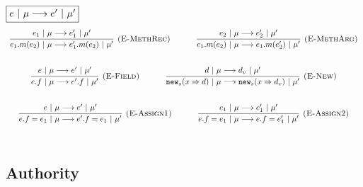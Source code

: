 \documentclass{llncs}
\newcommand{\keywadj}[1]{\mathtt{#1}}
\begin{document}
$\fbox{$e~|~\mu \longrightarrow e'~|~\mu'$}$
\[
\begin{array}{c}
\infer[\textsc{(E-MethRec)}]
  {e_1.m(e_2)~|~\mu \longrightarrow e_1'.m(e_2)~|~\mu'}
  {e_1~|~\mu \longrightarrow e_1'~|~\mu'}%
~~~~~~~~~~
\infer[\textsc{(E-MethArg)}]
  {e_1.m(e_2)~|~\mu \longrightarrow e_1.m(e_2')~|~\mu'}
  {e_2~|~\mu \longrightarrow e_2'~|~\mu'}\\[5ex]

\infer[\textsc{(E-Field)}]
  {e.f~|~\mu \longrightarrow e'.f~|~\mu'}
  {e~|~\mu \longrightarrow e'~|~\mu'}%
~~~~~~~~~~
\infer[\textsc{(E-New)}]
  {\keywadj{new}_{s}(x \Rightarrow d)~|~\mu \longrightarrow \keywadj{new}_{s}(x \Rightarrow d_v)~|~\mu'}
  {d~|~\mu \longrightarrow d_v~|~\mu'}\\[5ex]

\infer[\textsc{(E-Assign1)}]
  {e.f = e_1~|~\mu \longrightarrow e'.f = e_1~|~\mu'}
  {e~|~\mu \longrightarrow e'~|~\mu'}%
~~~~~~~~~~
\infer[\textsc{(E-Assign2)}]
  {e.f = e_1~|~\mu \longrightarrow e.f = e_1'~|~\mu'}
  {e_1~|~\mu \longrightarrow e_1'~|~\mu'}\\[5ex]

\end{array}
\]

\newpage

\subsection{Authority}
\end{document}
